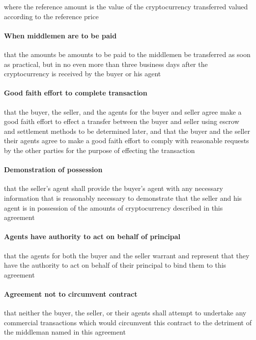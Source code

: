 \documentclass[10pt]{article}
\begin{document}
where the reference amount is the value of the cryptocurrency transferred valued according to the reference price

\paragraph{When middlemen are to be paid} that the amounts be amounts to be paid to the middlemen be transferred as soon as practical, but in no even more than three business days after the cryptocurrency is received by the buyer or his agent

\paragraph{Good faith effort to complete transaction} that the buyer, the seller, and the agents for the buyer and seller agree make a good faith effort to effect a transfer between the buyer and seller using escrow and settlement methods to be determined later, and that the buyer and the seller their agents agree to make a good faith effort to comply with reasonable requests by the other parties for the purpose of effecting the transaction

\paragraph{Demonstration of possession} that the seller’s agent shall provide the buyer’s agent with any necessary information that is reasonably necessary to demonstrate that the seller and his agent is in possession of the amounts of cryptocurrency described in this agreement

\paragraph{Agents have authority to act on behalf of principal} that the agents for both the buyer and the seller warrant and represent that they have the authority to act on behalf of their principal to bind them to this agreement

\paragraph{Agreement not to circumvent contract} that neither the buyer, the seller, or their agents shall attempt to undertake any commercial transactions which would circumvent this contract to the detriment of the middleman named in this agreement
\end{document}
